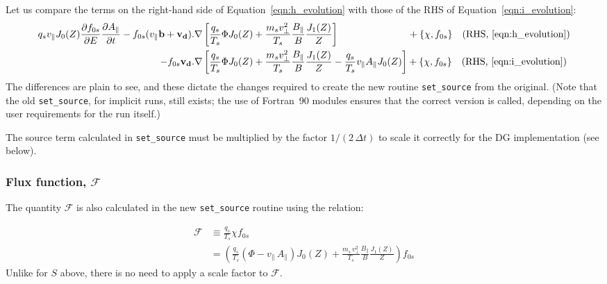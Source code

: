 \documentclass[10pt,a4paper]{article}
\newcommand{\dd}{\partial}
\begin{document}
Let us compare the terms on the right-hand side of
Equation~\ref{eqn:h_evolution} with those of the RHS of
Equation~\ref{eqn:i_evolution}:
\begin{align*}
  q_s v_\parallel J_0(Z) \frac{\dd f_{0s}}{\dd E} \frac{\dd
    A_\parallel}{\dd t} - f_{0s}(v_\parallel \mathbf{b} + \mathbf{v_d}).&\nabla 
  \left[ \frac{q_s}{T_s} \Phi J_0(Z) +\frac{m_s v_\perp^2}{T_s}
    \frac{B_\parallel}{B} \frac{J_1(Z)}{Z} \right]
  \;\;\;\;\;\;\;\;\;\;\;\;\;\;\;\;\;\;\;\;\;\;\;\;\;\; + \left\{ \chi,
    f_{0s}\right\} \;\;\;
  \mbox{(RHS, \ref{eqn:h_evolution})}\\
  - f_{0s} \mathbf{v_d}.&\nabla
  \left[ \frac{q_s}{T_s} \Phi J_0(Z) + \frac{m_s v_\perp^2}{T_s} \frac{B_\parallel}{B}
    \frac{J_1(Z)}{Z} - \frac{q_s}{T_s} v_\parallel A_\parallel J_0(Z) \right]
  + \left\{ \chi, f_{0s}\right\}\;\;\;\mbox{(RHS, \ref{eqn:i_evolution})}
\end{align*}
The differences are plain to see, and these dictate the changes required to
create the new routine \texttt{set\_source} from the original. (Note that the
old \texttt{set\_source}, for implicit runs, still exists; the use of
Fortran~90 modules ensures that the correct version is called, depending on
the user requirements for the run itself.)

The source term calculated in \texttt{set\_source} must be multiplied by the
factor $1/(2\,\Delta t)$ to scale it correctly for the DG implementation (see
below).

\subsubsection*{Flux function, $\mathcal{F}$}

The quantity $\mathcal{F}$ is also calculated in the new \texttt{set\_source}
routine using the relation:

\begin{align*}
\mathcal{F} & \equiv \frac{q_s}{T_s} \chi f_{0s} \\
& = \left( \frac{q_s}{T_s}(\Phi - v_\parallel \, A_\parallel) J_0(Z) + \frac{m_s \,
v_\perp^2}{T_s} \frac{B_\parallel}{B} \frac{J_1(Z)}{Z} \right) f_{0s}
\end{align*}
Unlike for $S$ above, there is no need to apply a scale factor to $\mathcal{F}$.
\end{document}
